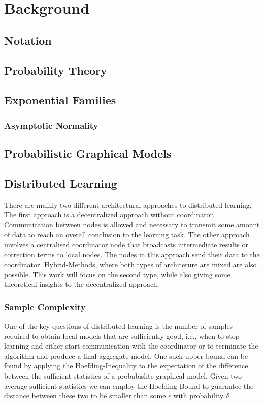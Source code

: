 \chapter{Background}
\label{chapter:kap2}
\section{Notation}
\section{Probability Theory}
\section{Exponential Families}
\subsection{Asymptotic Normality}
\section{Probabilistic Graphical Models}

\section{Distributed Learning}
There are mainly two different architectural approaches to distributed learning. 
The first approach is a decentralized approach without coordinator.
Communication between nodes is allowed and necessary to transmit some amount of data to reach an overall conclusion to the learning task.
The other approach involves a centralised coordinator node that broadcasts intermediate results or correction terms to local nodes.
The nodes in this approach send their data to the coordinator. 
Hybrid-Methods, where both types of architerure are mixed are also possible.
This work will focus on the second type, while also giving some theoretical insights to the decentralized approach.

\subsection{Sample Complexity}
One of the key questions of distributed learning is the number of samples required to obtain local models that are sufficiently good, i.e., when to stop learning and either start communication with the coordinator
or to terminate the algorithm and produce a final aggregate model. 
One such upper bound can be found by applying the Hoefding-Inequality to the expectation of the difference between the sufficient statistics of a probabislitc graphical model.
Given two average sufficient statistics we can employ the Hoefding Bound to guarantee the distance between these two to be smaller than some $\epsilon$ with probability $\delta$

